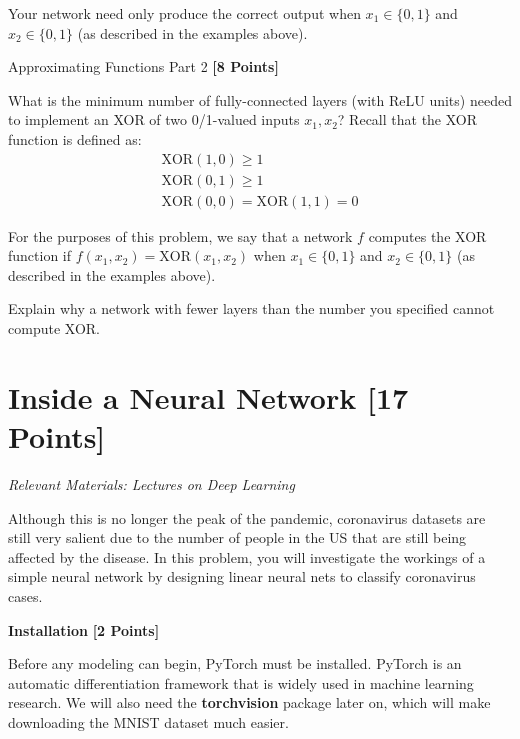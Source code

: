 Your network need only produce the correct output when $x_1 \in \{0, 1\}$ and $x_2 \in \{0, 1\}$ (as described in the examples above).

\begin{subsolution}

\end{subsolution}

\problem Approximating Functions Part 2 \textbf{[8 Points]}

What is the minimum number of fully-connected layers (with ReLU units) needed to implement an XOR of two 0/1-valued inputs $x_1, x_2$? Recall that the XOR function is defined as:
\begin{gather*}
\text{XOR}(1, 0) \geq 1 \\
\text{XOR}(0, 1) \geq 1 \\
\text{XOR}(0, 0) = \text{XOR}(1, 1) = 0
\end{gather*}

For the purposes of this problem, we say that a network $f$ computes the XOR function if $f(x_1, x_2) = \text{XOR}(x_1, x_2)$ when $x_1 \in \{0, 1\}$ and $x_2 \in \{0, 1\}$ (as described in the examples above).

Explain why a network with fewer layers than the number you specified cannot compute XOR.


\begin{subsolution}

\end{subsolution}


\newpage
\section{Inside a Neural Network  [17 Points]}

\textit{Relevant Materials: Lectures on Deep Learning}

Although this is no longer the peak of the pandemic, coronavirus datasets are still very salient due to the number of people in the US that are still being affected by the disease. In this problem, you will investigate the workings of a simple neural network by designing linear neural nets to classify coronavirus cases.

\medskip

\problem \textbf{Installation} \textbf{[2 Points]}

Before any modeling can begin, PyTorch must be installed. PyTorch is an automatic differentiation framework that is widely used in machine learning research.  We will also need the \textbf{torchvision} package later on, which will make downloading the MNIST dataset much easier. 


